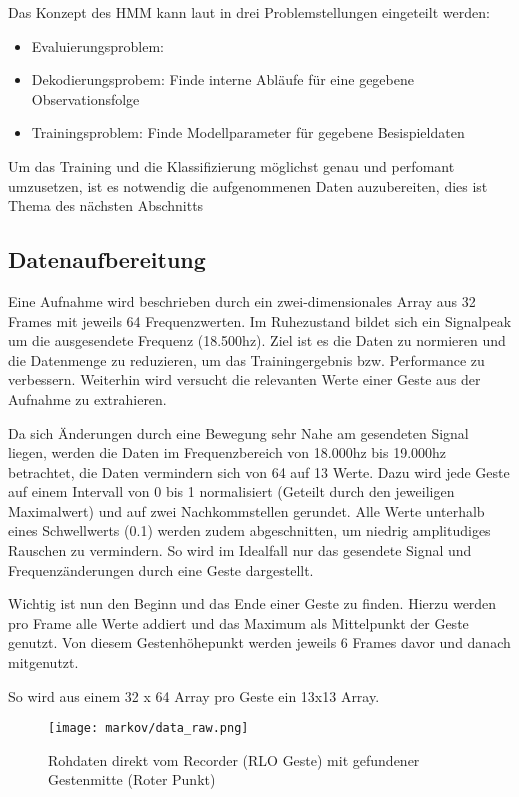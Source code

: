 Das Konzept des \acl{HMM} kann laut \cite{rabiner} in drei Problemstellungen eingeteilt werden:
\begin{itemize}
  \item Evaluierungsproblem: 
  \item Dekodierungsprobem: Finde interne Abläufe für eine gegebene Observationsfolge
  \item Trainingsproblem: Finde Modellparameter für gegebene Besispieldaten
\end{itemize}




Um das Training und die Klassifizierung möglichst genau und perfomant umzusetzen, 
ist es notwendig die aufgenommenen Daten auzubereiten, dies ist Thema des nächsten Abschnitts


\subsection{Datenaufbereitung} \label{sec:preproc}
Eine Aufnahme wird beschrieben durch ein zwei-dimensionales Array aus 32 Frames mit jeweils 64 Frequenzwerten.
Im Ruhezustand bildet sich ein Signalpeak um die ausgesendete Frequenz (18.500hz).
Ziel ist es die Daten zu normieren und die Datenmenge zu reduzieren, um das Trainingergebnis bzw. Performance zu verbessern.
Weiterhin wird versucht die relevanten Werte einer Geste aus der Aufnahme zu extrahieren.

Da sich Änderungen durch eine Bewegung sehr Nahe am gesendeten Signal liegen, werden die Daten im 
Frequenzbereich von 18.000hz bis 19.000hz betrachtet, die Daten vermindern sich von 64 auf 13 Werte. 
Dazu wird jede Geste auf einem Intervall von 0 bis 1 normalisiert (Geteilt durch den jeweiligen Maximalwert) und 
auf zwei Nachkommstellen gerundet. 
Alle Werte unterhalb eines Schwellwerts (0.1) werden zudem abgeschnitten, um niedrig amplitudiges Rauschen zu vermindern. 
So wird im Idealfall nur das gesendete Signal und Frequenzänderungen durch eine Geste dargestellt.

Wichtig ist nun den Beginn und das Ende einer Geste zu finden. Hierzu werden pro Frame alle Werte addiert 
und das Maximum als Mittelpunkt der Geste genutzt. Von diesem Gestenhöhepunkt werden jeweils 6 Frames davor und danach mitgenutzt.

So wird aus einem 32 x 64 Array pro Geste ein 13x13 Array.

\begin{figure}[htbp] \centering
    \texttt{[image: markov/data\_raw.png]}
    \caption{Rohdaten direkt vom Recorder (\acl{RLO} Geste) mit gefundener Gestenmitte (Roter Punkt)}
    \label{fig:data_raw}
\end{figure}

